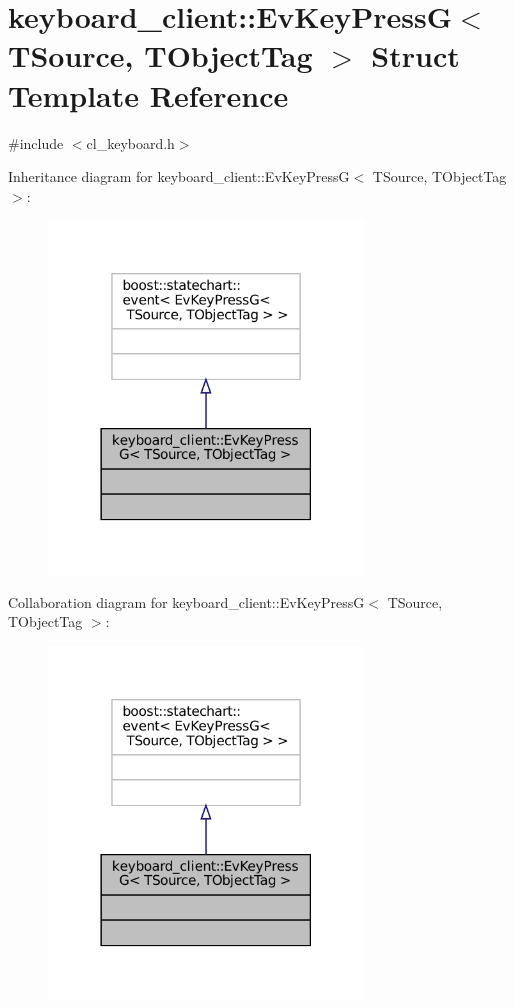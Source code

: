 \hypertarget{structkeyboard__client_1_1EvKeyPressG}{}\section{keyboard\+\_\+client\+:\+:Ev\+Key\+PressG$<$ T\+Source, T\+Object\+Tag $>$ Struct Template Reference}
\label{structkeyboard__client_1_1EvKeyPressG}


{\ttfamily \#include $<$cl\+\_\+keyboard.\+h$>$}



Inheritance diagram for keyboard\+\_\+client\+:\+:Ev\+Key\+PressG$<$ T\+Source, T\+Object\+Tag $>$\+:
\nopagebreak
\begin{figure}[H]
\begin{center}
\leavevmode
\includegraphics[width=237pt]{structkeyboard__client_1_1EvKeyPressG__inherit__graph}
\end{center}
\end{figure}


Collaboration diagram for keyboard\+\_\+client\+:\+:Ev\+Key\+PressG$<$ T\+Source, T\+Object\+Tag $>$\+:
\nopagebreak
\begin{figure}[H]
\begin{center}
\leavevmode
\includegraphics[width=237pt]{structkeyboard__client_1_1EvKeyPressG__coll__graph}
\end{center}
\end{figure}


